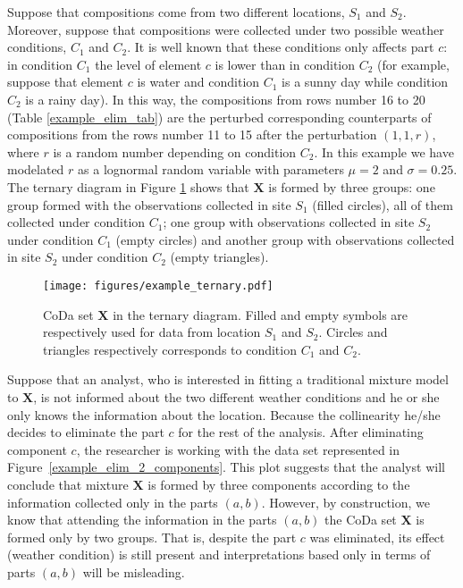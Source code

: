 \documentclass[12pt, a4paper]{article}
\begin{document}
Suppose that compositions come from two different locations, $S_1$ and $S_2$. Moreover, suppose that compositions were collected under two possible weather conditions, $C_1$ and $C_2$. It is well known
that these conditions only affects part $c$: in condition $C_1$ the level of element $c$ is lower than in condition $C_2$ (for example, suppose that element $c$ is water and condition $C_1$ is a sunny day while condition $C_2$ is a rainy day). In this way, the compositions from rows number 16 to 20 (Table  
\ref{example_elim_tab}) are the perturbed corresponding counterparts of compositions from the
rows number 11 to 15 after the perturbation $(1,1,r)$, where $r$ is a random number depending on condition $C_2$. In this example we have modelated $r$ as a lognormal random variable with parameters $\mu=2$ and $\sigma=0.25$. 
The ternary diagram in Figure \ref{example_elim_component} shows that $\mathbf{X}$ is formed by three groups: one group formed with the observations collected in site $S_1$ (filled circles), all of them collected under condition $C_1$; one group with observations collected in site $S_2$ under condition $C_1$ (empty circles) and another group with observations collected in site $S_2$ under condition $C_2$ (empty triangles).

\begin{figure}[thbp]
\centering
\texttt{[image: figures/example\_ternary.pdf]}
\caption{CoDa set $\mathbf{X}$ in the ternary diagram. Filled and empty symbols are respectively used for
data from location $S_1$ and $S_2$. Circles and triangles respectively corresponds to condition
$C_1$ and $C_2$. }\label{example_elim_component}
\end{figure}
Suppose that an analyst, who is interested in fitting a traditional mixture model to $\mathbf{X}$, is not informed about the two different weather conditions and he or she only knows the information about the location. Because 
the collinearity he/she decides to eliminate the part $c$ for the rest of the analysis. After eliminating component $c$, the researcher is working with the data set represented in Figure~\ref{example_elim_2_components}. This plot suggests that the analyst will conclude that mixture $\mathbf{X}$ is formed by three components according to the information collected only in the parts $(a, b)$. However, by construction, we know that attending the information in the parts $(a, b)$ the CoDa set $\mathbf{X}$ is formed only by two groups. That is, despite the part $c$ was eliminated, its effect (weather condition) is still present and interpretations based only in terms
of parts $(a, b)$ will be misleading.
\end{document}
